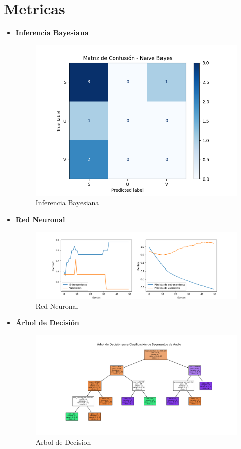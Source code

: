 \documentclass{report}
\begin{document}
\section{Metricas}
\begin{itemize}
    \item \textbf{Inferencia Bayesiana}
    \begin{figure}[h]
        \centering
        \includegraphics[width=\linewidth]{bayes.png}
        \caption{Inferencia Bayesiana}
        \label{fig:inferenciabayesiana}
    \end{figure}
    \newpage
    \item \textbf{Red Neuronal}
    \begin{figure}[h]
        \centering
        \includegraphics[width=\linewidth]{reddd.png}
        \caption{Red Neuronal}
        \label{fig:redneuronal}
    \end{figure}
    \item \textbf{Árbol de Decisión}
    \begin{figure}[h]
        \centering
        \includegraphics[width=\linewidth]{arbol.png}
        \caption{Arbol de Decision}
        \label{fig:arbol}
    \end{figure}
\end{itemize}
\end{document}
